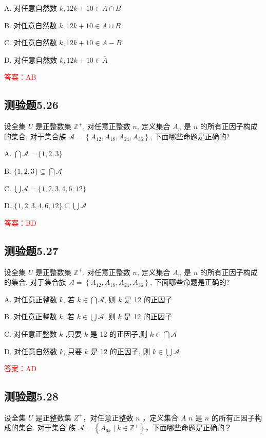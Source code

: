 \documentclass[UTF8, heading=true]{ctexart}
\begin{document}
A. 对任意自然数 $k, 12 k+10 \in A \cap B$

B. 对任意自然数 $k, 12 k+10 \in A \cup B$

C. 对任意自然数 $k, 12 k+10 \in A-B$

D. 对任意自然数 $k, 12 k+10 \in \bar{A}$

\textcolor{red}{答案：AB}

\subsection{测验题5.26}

设全集 $U$ 是正整数集 $\mathbb{Z}^{+}$, 对任意正整数 $n$, 定义集合 $A_n$ 是 $n$ 的所有正因子构成的集合, 对于集合族 $\mathcal{A}=\left\{A_{12}, A_{18}, A_{24}, A_{36}\right\}$, 下面哪些命题是正确的?

A. $\bigcap \mathcal{A}=\{1,2,3\}$

B. $\{1,2,3\} \subseteq \bigcap \mathcal{A}$

C. $\bigcup \mathcal{A}=\{1,2,3,4,6,12\}$

D. $\{1,2,3,4,6,12\} \subseteq \bigcup \mathcal{A}$

\textcolor{red}{答案：BD}

\subsection{测验题5.27}

设全集 $U$ 是正整数集 $\mathbb{Z}^{+}$, 对任意正整数 $n$, 定义集合 $A_n$ 是 $n$ 的所有正因子构成的集合, 对于集合族 $\mathcal{A}=\left\{A_{12}, A_{18}, A_{24}, A_{36}\right\}$, 下面哪些命题是正确的?

A. 对任意正整数 $k$, 若 $k \in \bigcap \mathcal{A}$, 则 $k$ 是 12 的正因子

B. 对任意正整数 $k$, 若 $k \in \bigcup \mathcal{A}$, 则 $k$ 是 12 的正因子

C. 对任意正整数 $k$ ,只要 $k$ 是 12 的正因子,则 $k \in \bigcap \mathcal{A}$

D. 对任意自然数 $k$, 只要 $k$ 是 12 的正因子, 则 $k \in \bigcup \mathcal{A}$

\textcolor{red}{答案：AD}

\subsection{测验题5.28}

设全集 $U$ 是正整数集 $Z^{+}$，对任意正整数 $n$ ，定义集合 $A$ $n$ 是 $n$ 的所有正因子构成的集合. 对于集合
族 $\mathcal{A}=\left\{A_{6 k} \mid k \in \mathbb{Z}^{+}\right\}$，下面哪些命题是正确的？
\end{document}
